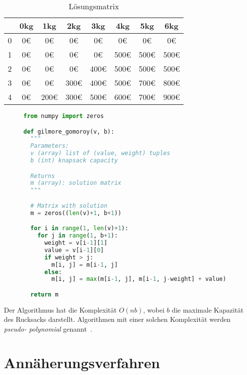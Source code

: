 \documentclass[12pt, a4paper, ngerman]{article}
\begin{document}
\begin{table}
  \renewcommand{\arraystretch}{1.2}
  \centering
  \begin{tabular}{c |c c c c c c c}
      & 0kg & 1kg  & 2kg  & 3kg  & 4kg  & 5kg  & 6kg  \\
    \hline
    0 & 0€  & 0€   & 0€   & 0€   & 0€   & 0€   & 0€   \\
    1 & 0€  & 0€   & 0€   & 0€   & 500€ & 500€ & 500€ \\
    2 & 0€  & 0€   & 0€   & 400€ & 500€ & 500€ & 500€ \\
    3 & 0€  & 0€   & 300€ & 400€ & 500€ & 700€ & 800€ \\
    4 & 0€  & 200€ & 300€ & 500€ & 600€ & 700€ & 900€
  \end{tabular}
  \caption{Lösungsmatrix}
  \label{tab:mat}
\end{table}

\begin{figure}
  \begin{lstlisting}[language=Python,style=light,caption={Gilmore Gomoroy in Python}, label={lst:dyn_opt}]
from numpy import zeros

def gilmore_gomoroy(v, b):
  """
  Parameters: 
  v (array) list of (value, weight) tuples
  b (int) knapsack capacity

  Returns
  m (array): solution matrix
  """

  # Matrix with solution
  m = zeros((len(v)+1, b+1))

  for i in range(1, len(v)+1):
    for j in range(1, b+1):
      weight = v[i-1][1]
      value = v[i-1][0]
      if weight > j:
        m[i, j] = m[i-1, j]
      else:
        m[i, j] = max(m[i-1, j], m[i-1, j-weight] + value)

  return m
\end{lstlisting}
\end{figure}

Der Algorithmus hat die Komplexität \(O(nb)\),
wobei \(b\) die maximale Kapazität des Rucksacks darstellt.
Algorithmen mit einer solchen Komplexität werden \emph{pseudo- polynomial} genannt~\cite{scheiterhauer2008}.

\FloatBarrier
\section{Annäherungsverfahren}
\label{sec:approx}
\end{document}
